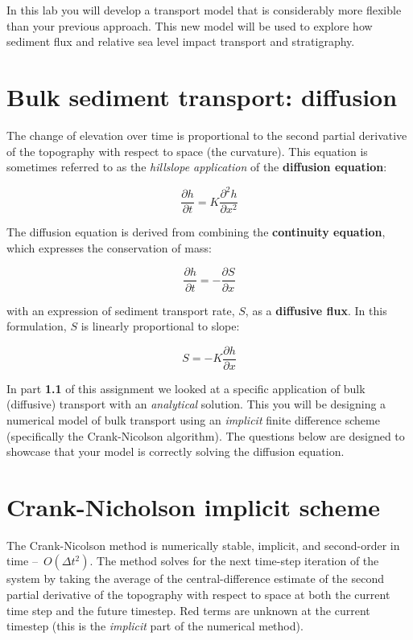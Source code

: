 In this lab you will develop a transport model that is considerably more flexible than your previous approach. This new model will be used to explore how sediment flux and relative sea level impact transport and stratigraphy.

\section*{Bulk sediment transport: diffusion}
The change of elevation over time is proportional to the second partial derivative of the topography with respect to space (the curvature). This equation is sometimes referred to as the \textit{hillslope application} of the \textbf{diffusion equation}:

\begin{equation*}
	\dfrac{\partial h}{\partial t} = K \dfrac{\partial^2 h}{\partial x^2} \label{eq:diff}\tag{diffusion equation}
\end{equation*}

The diffusion equation is derived from combining the  \textbf{continuity equation}, which expresses the conservation of mass:

\begin{equation*}
	\dfrac{\partial h}{\partial t} = - \dfrac{\partial S}{\partial x} \label{eq:cont}\tag{continuity equation}
\end{equation*}

with an expression of sediment transport rate, $S$, as a \textbf{diffusive flux}. In this formulation, $S$ is linearly proportional to slope:

\begin{equation*} S = - K \dfrac{\partial h}{\partial x}\tag{diffusive flux}
\end{equation*}

In part \textbf{1.1} of this assignment we looked at a specific application of bulk (diffusive) transport with an \emph{analytical} solution. This you will be designing a numerical model of bulk transport using an \emph{implicit} finite difference scheme (specifically the Crank-Nicolson algorithm). The questions below are designed to showcase that your model is correctly solving the diffusion equation.

\section*{Crank-Nicholson implicit scheme}
The Crank-Nicolson method is numerically stable, implicit, and second-order in time --~$O(\Delta t^2)$. The method solves for the next time-step iteration of the system by taking the average of the central-difference estimate of the second partial derivative of the topography with respect to space at both the current time step and the future timestep. {\color{red}Red} terms are unknown at the current timestep (this is the \emph{implicit} part of the numerical method).

